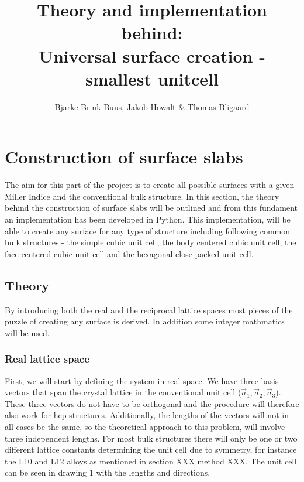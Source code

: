 \documentclass[11pt]{article} %
\title{Theory and implementation behind: \\Universal surface creation - smallest unitcell}
\author{Bjarke Brink Buus, Jakob Howalt \& Thomas Bligaard}
\begin{document}
\maketitle
\section{Construction of surface slabs}
The aim for this part of the project is to create all possible surfaces with a given Miller Indice and the conventional bulk structure. In this section, the theory behind the construction of surface slabs will be outlined and from this fundament an implementation has been developed in Python. This implementation, will be able to create any surface for any type of structure including following common bulk structures - the simple cubic unit cell, the body centered cubic unit cell, the face centered cubic unit cell and the hexagonal close packed unit cell.
\subsection{Theory}
By introducing both the real and the reciprocal lattice spaces most pieces of the puzzle of creating any surface is derived. In addition some integer mathmatics will be used.
\subsubsection{Real lattice space}
First, we will start by defining the system in real space. We have three basis vectors that span the crystal lattice in the conventional unit cell ($\vec{a}_1,\vec{a}_2,\vec{a}_3$). These three vectors do not have to be orthogonal and the procedure will therefore also work for hcp structures. Additionally, the lengths of the vectors will not in all cases be the same, so the theoretical approach to this problem, will involve three independent lengths. For most bulk structures there will only be one or two different lattice constants determining the unit cell due to symmetry, for instance the L10 and L12 alloys as mentioned in section XXX method XXX. The unit cell can be seen in drawing 1 with the lengths and directions.
\end{document}
